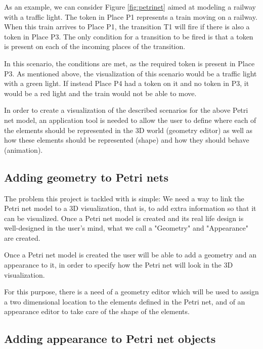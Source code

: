 As an example, we can consider Figure \ref{fig:petrinet} aimed at modeling a railway with a traffic light. The token in Place P1 represents a train moving on a railway. When this train arrives to Place P1, the transition T1 will fire if there is also a token in Place P3. The only condition for a transition to be fired is that a token is present on each of the incoming places of the transition.

In this scenario, the conditions are met, as the required token is present in Place P3. As mentioned above, the visualization of this scenario would be a traffic light with a green light. If instead Place P4 had a token on it and no token in P3, it would be a red light and the train would not be able to move. 


In order to create a visualization of the described scenarios for the above Petri net model, an application tool is needed to allow the user to define where each of the elements should be represented in the 3D world (geometry editor) as well as how these elements should be represented (shape) and how they should behave (animation). 

\subsection{Adding geometry to Petri nets}
The problem this project is tackled with is simple: We need a way to link the Petri net model to a 3D visualization, that is, to add extra information so that it can be visualized. Once a Petri net model is created and its real life design is well-designed in the user's mind, what we call a "Geometry" and "Appearance" are created. 

Once a Petri net model is created the user will be able to add a geometry and an appearance to it, in order to specify how the Petri net will look in the 3D visualization.

For this purpose, there is a need of a geometry editor which will be used to assign a two dimensional location to the elements defined in the Petri net, and of an appearance editor to take care of the shape of the elements.

\subsection{Adding appearance to Petri net objects}
\label{sec:appearance}

